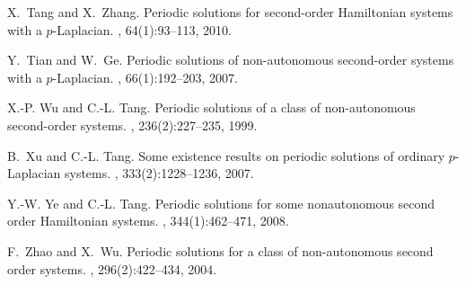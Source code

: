 \documentclass[twoside]{elsarticle}
\theoremstyle{remark}
\begin{document}
\begin{thebibliography}{10}
X.~Tang and X.~Zhang.
\newblock Periodic solutions for second-order {H}amiltonian systems with a
  {$p$}-{L}aplacian.
, 64(1):93--113,
  2010.

Y.~Tian and W.~Ge.
\newblock Periodic solutions of non-autonomous second-order systems with a
  {$p$}-{L}aplacian.
, 66(1):192--203, 2007.

X.-P. Wu and C.-L. Tang.
\newblock Periodic solutions of a class of non-autonomous second-order systems.
, 236(2):227--235, 1999.

B.~Xu and C.-L. Tang.
\newblock Some existence results on periodic solutions of ordinary
  {$p$}-{L}aplacian systems.
, 333(2):1228--1236, 2007.

Y.-W. Ye and C.-L. Tang.
\newblock Periodic solutions for some nonautonomous second order {H}amiltonian
  systems.
, 344(1):462--471, 2008.

F.~Zhao and X.~Wu.
\newblock Periodic solutions for a class of non-autonomous second order
  systems.
, 296(2):422--434, 2004.

\end{thebibliography}




%

\end{document}
